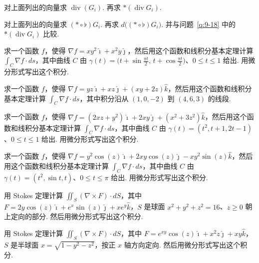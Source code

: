 \begin{question}\label{q:9-18}
对上面列出的向量求 $\operatorname{div}(G_i)$. 再求 $\ast(\operatorname{div}G_i)$.
\end{question}

\begin{question}\label{q:9-19}
对上面列出的向量求 $(\ast\circ\flat)G_i$. 再求 $d\bigl((\ast\circ\flat)G_i\bigr)$. 并与问题~\ref{q:9-18} 中的 $\ast(\operatorname{div}G_i)$ 比较.
\end{question}

\begin{question}\label{q:9-20}
求一个函数 $f$，使得 $\nabla f=xy^2\hat{\imath}+x^2y\hat{\jmath}$，然后用这个函数和线积分基本定理计算 $\int_C\nabla f\cdot ds$，其中曲线 $C$ 由 $\gamma(t)=\bigl(t+\sin\frac{\pi t}{2},\,t+\cos\frac{\pi t}{2}\bigr)$、$0\leq t\leq1$ 给出. 用微分形式写出这个积分.
\end{question}

\begin{question}\label{q:9-21}
求一个函数 $f$，使得 $\nabla f=yz\hat{\imath}+xz\hat{\jmath}+(xy+2z)\hat{k}$，然后用这个函数和线积分基本定理计算 $\int_C\nabla f\cdot ds$，其中积分沿从 $(1,0,-2)$ 到 $(4,6,3)$ 的线段.
\end{question}

\begin{question}\label{q:9-22}
求一个函数 $f$，使得 $\nabla f=(2xz+y^2)\hat{\imath}+2xy\hat{\jmath}+(x^2+3z^2)\hat{k}$，然后用这个函数和线积分基本定理计算 $\int_C\nabla f\cdot ds$，其中曲线 $C$ 由 $\gamma(t)=(t^2,t+1,2t-1)$、$0\leq t\leq1$ 给出. 用微分形式写出这个积分.
\end{question}

\begin{question}\label{q:9-23}
求一个函数 $f$，使得 $\nabla f=y^2\cos(z)\hat{\imath}+2xy\cos(z)\hat{\jmath}-xy^2\sin(z)\hat{k}$，然后用这个函数和线积分基本定理计算 $\int_C\nabla f\cdot ds$，其中曲线 $C$ 由 $\gamma(t)=(t^2,\sin t,t)$、$0\leq t\leq\pi$ 给出. 用微分形式写出这个积分.
\end{question}

\begin{question}\label{q:9-24}
用 Stokes 定理计算 $\iint_S(\nabla\times F)\cdot dS$，其中 $F=2y\cos(z)\hat{\imath}+e^x\sin(z)\hat{\jmath}+xe^y\hat{k}$，$S$ 是球面 $x^2+y^2+z^2=16$、$z\geq0$ 朝上定向的部分. 然后用微分形式写出这个积分.
\end{question}

\begin{question}\label{q:9-25}
用 Stokes 定理计算 $\iint_S(\nabla\times F)\cdot dS$，其中 $F=e^{xy}\cos(z)\hat{\imath}+x^2z\hat{\jmath}+xy\hat{k}$，$S$ 是半球面 $x=\sqrt{1-y^2-z^2}$，按正 $x$ 轴方向定向. 然后用微分形式写出这个积分.
\end{question}

